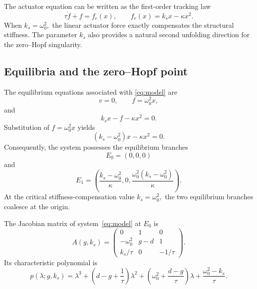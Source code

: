 \documentclass[11pt,reqno]{amsart}
\theoremstyle{plain}
\theoremstyle{definition}
\theoremstyle{remark}
\begin{document}
The actuator equation can be written as the first-order tracking law
\[
\tau\dot f+f=f_c(x),
\qquad
f_c(x)=k_sx-\kappa x^2.
\]
When
$
k_s=\omega_0^2,
$
the linear actuator force exactly compensates the structural stiffness.
The parameter \(k_s\) also provides a natural second unfolding direction
for the zero--Hopf singularity.

\subsection{Equilibria and the zero--Hopf point}
\label{subsec:equilibria-zero-Hopf}

The equilibrium equations associated with \eqref{eq:model} are
\[
v=0,
\qquad
f=\omega_0^2x,
\]
and
\[
k_sx-f-\kappa x^2=0.
\]
Substitution of \(f=\omega_0^2x\) yields
\begin{equation}
\label{eq:equilibrium-equation}
(k_s-\omega_0^2)x-\kappa x^2=0.
\end{equation}
Consequently, the system possesses the equilibrium branches
\begin{equation}
\label{eq:equilibrium-branches}
E_0=(0,0,0)
\end{equation}
and
\begin{equation}
\label{eq:second-equilibrium}
E_1
=
\left(
\frac{k_s-\omega_0^2}{\kappa},
0,
\frac{\omega_0^2(k_s-\omega_0^2)}{\kappa}
\right).
\end{equation}
At the critical stiffness-compensation value
$
k_s=\omega_0^2,
$
the two equilibrium branches coalesce at the origin.

The Jacobian matrix of system~\eqref{eq:model} at \(E_0\) is
\begin{equation}
\label{eq:Jacobian-origin}
A(g,k_s)
=
\begin{pmatrix}
0&1&0\\[1mm]
-\omega_0^2&g-d&1\\[1mm]
k_s/\tau&0&-1/\tau
\end{pmatrix}.
\end{equation}
Its characteristic polynomial is
\begin{equation}
\label{eq:characteristic-polynomial}
p(\lambda;g,k_s)
=
\lambda^3
+
\left(d-g+\frac1\tau\right)\lambda^2
+
\left(
\omega_0^2+\frac{d-g}{\tau}
\right)\lambda
+
\frac{\omega_0^2-k_s}{\tau}.
\end{equation}
\end{document}
